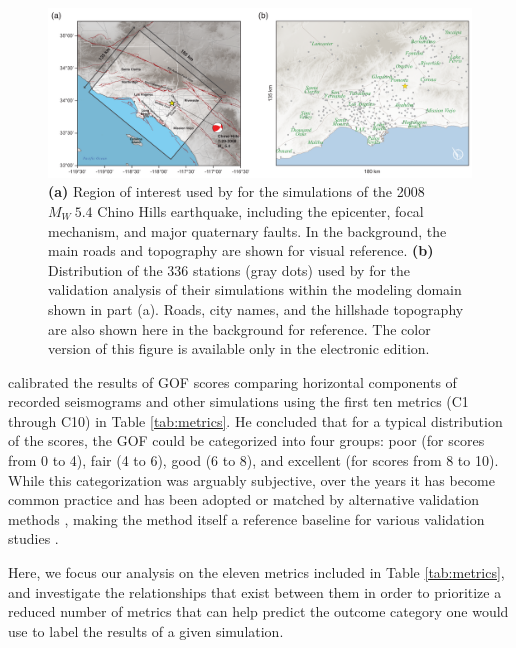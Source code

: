 \begin{figure}
    \centering
    \includegraphics[width=\textwidth]{figures/pdf/figure-01}
    \caption{\textbf{(a)} Region of interest used by \citet{Taborda_2014_BSSA} for the simulations of the 2008 $M_W ~ 5.4$ Chino Hills earthquake, including the epicenter, focal mechanism, and major quaternary faults. In the background, the main roads and topography are shown for visual reference. \textbf{(b)} Distribution of the 336 stations (gray dots) used by \citet{Taborda_2014_BSSA} for the validation analysis of their simulations within the modeling domain shown in part (a). Roads, city names, and the hillshade topography are also shown here in the background for reference. The color version of this figure is available only in the electronic edition.}
    \label{fig:chino-hills}
\end{figure}

\citet{Anderson_2004_Proc} calibrated the results of GOF scores comparing horizontal components of recorded seismograms and other simulations using the first ten metrics (C1 through C10) in Table \ref{tab:metrics}. He concluded that for a typical distribution of the scores, the GOF could be categorized into four groups: poor (for scores from 0 to 4), fair (4 to 6), good (6 to 8), and excellent (for scores from 8 to 10). While this categorization was arguably subjective, over the years it has become common practice and has been adopted or matched by alternative validation methods \citep[e.g.,][]{Kristekova_2009_GJI, Olsen_2010_SRL}, making the method itself a reference baseline for various validation studies \citep[e.g.,][]{Chaljub_2010_BSSA, Bielak_2010_GJI, Guidotti_2011_SRL, Maufroy_2015_BSSA}.

Here, we focus our analysis on the eleven metrics included in Table \ref{tab:metrics}, and investigate the relationships that exist between them in order to prioritize a reduced number of metrics that can help predict the outcome category one would use to label the results of a given simulation.
